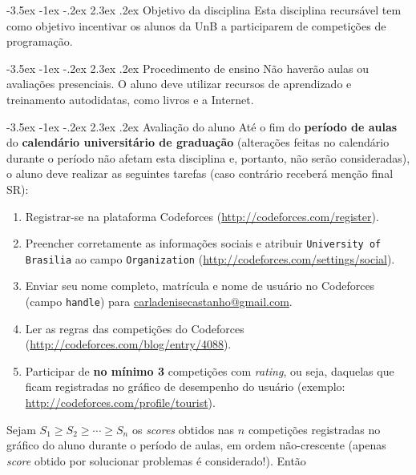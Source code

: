\documentclass{UnBExam}%
\makeatletter
\newcommand{\numerocontests}{3}
\renewcommand\section{\@startsection{section}{1}{\z@}%
	{-3.5ex \@plus -1ex \@minus -.2ex}%
	{2.3ex \@plus.2ex}%
	{\normalfont\normalsize\bfseries}}%
\renewcommand{\indent}{\hspace{.5cm}}
\makeatother
\begin{document}
\section{Objetivo da disciplina}
\indent Esta disciplina recursável tem como objetivo incentivar os alunos da UnB a participarem de competições de programação.

\vspace{-.1cm}
\section{Procedimento de ensino}
\indent Não haverão aulas ou avaliações presenciais. O aluno deve utilizar recursos de aprendizado e treinamento autodidatas, como livros \cite{halim2013competitive,cormen2009introduction} e a Internet.

\vspace{-.1cm}
\section{Avaliação do aluno}
\indent Até o fim do \textbf{período de aulas} do \textbf{calendário universitário de graduação} (alterações feitas no calendário durante o período não afetam esta disciplina e, portanto, não serão consideradas), o aluno deve realizar as seguintes tarefas (caso contrário receberá menção final SR):
\begin{enumerate}
	\item Registrar-se na plataforma Codeforces (\url{http://codeforces.com/register}).
	\item Preencher corretamente as informações sociais e atribuir \texttt{University of Brasilia} ao campo \texttt{Organization} (\url{http://codeforces.com/settings/social}).
	\item Enviar seu nome completo, matrícula e nome de usuário no Codeforces (campo \texttt{handle}) para \url{carladenisecastanho@gmail.com}.
	\item Ler as regras das competições do Codeforces (\url{http://codeforces.com/blog/entry/4088}).
	\item Participar de \textbf{no mínimo \numerocontests} competições com \textit{rating}, ou seja, daquelas que ficam registradas no gráfico de desempenho do usuário (exemplo: \url{http://codeforces.com/profile/tourist}).
\end{enumerate}
\indent Sejam $S_1 \geq S_2 \geq \cdots \geq S_n$ os \textit{scores} obtidos nas $n$ competições registradas no gráfico do aluno durante o período de aulas, em ordem não-crescente (apenas \textit{score} obtido por solucionar problemas é considerado!). Então
\end{document}
